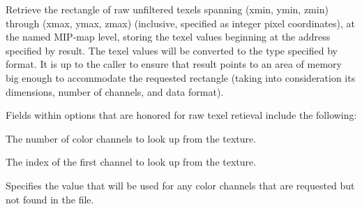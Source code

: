
Retrieve the rectangle of raw unfiltered texels spanning
(xmin, ymin, zmin) through (xmax, ymax, zmax) (inclusive, specified as
integer pixel coordinates), at the named MIP-map level, storing
the texel values beginning at the address specified by result.
The texel values will be converted to the type specified by
format.  It is up to the caller to ensure that result points to
an area of memory big enough to accommodate the requested
rectangle (taking into consideration its dimensions, number of
channels, and data format).

Fields within {\cf options} that are honored for raw texel retieval
include the following:

\vspace{-12pt}
\vspace{10pt}
The number of color channels to look up from the texture.
\apiend

\vspace{-24pt}
\vspace{10pt}
The index of the first channel to look up from the texture.
\apiend


\vspace{-24pt}
\vspace{10pt}
Specifies the value that will be used for any color channels that are
requested but not found in the file.
\apiend


